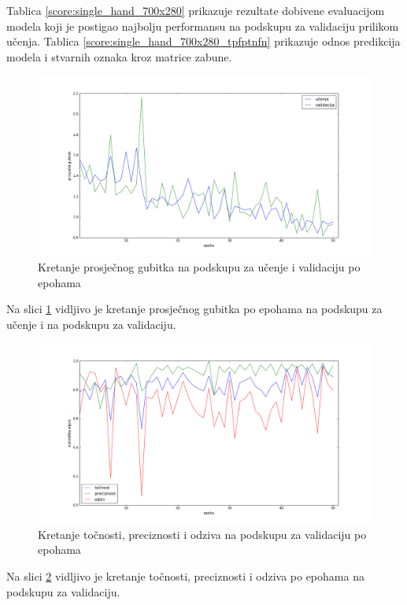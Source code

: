 \documentclass[times, utf8, diplomski, numeric]{fer}
\begin{document}
\noindent Tablica \ref{score:single_hand_700x280} prikazuje rezultate dobivene evaluacijom modela koji je postigao najbolju performansu na podskupu za validaciju prilikom učenja.
Tablica \ref{score:single_hand_700x280_tpfptnfn} prikazuje odnos predikcija modela i stvarnih oznaka kroz matrice zabune.

\begin{figure}[H]
\centering
\includegraphics[scale=0.35]{images/single_hand_scale1_loss.png}
\caption{Kretanje prosječnog gubitka na podskupu za učenje i validaciju po epohama}
\label{img:single_hand_scale1_loss}
\end{figure}
\noindent Na slici \ref{img:single_hand_scale1_loss} vidljivo je kretanje prosječnog gubitka po epohama na podskupu za učenje i na podskupu za validaciju.

\begin{figure}[H]
\centering
\includegraphics[scale=0.35]{images/single_hand_scale1_acc_ap.png}
\caption{Kretanje točnosti, preciznosti i odziva na podskupu za validaciju po epohama}
\label{img:single_hand_scale1_acc_ap}
\end{figure}
\noindent Na slici \ref{img:single_hand_scale1_acc_ap} vidljivo je kretanje točnosti, preciznosti i odziva po epohama na podskupu za validaciju.
\end{document}
